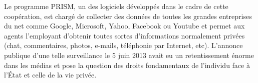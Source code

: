 \documentclass[article, french]{yReport}
\begin{document}
	Le programme PRISM, un des logiciels développés dans le cadre de cette coopération, est chargé de collecter des données de toutes les grandes entreprises du net comme Google, Microsoft, Yahoo, Facebook ou Youtube et permet aux agents l'employant d'obtenir toutes sortes d'informations normalement privées (chat, commentaires, photos, e-mails, téléphonie par Internet, etc).
	L'annonce publique d'une telle surveillance le 5 juin 2013 avait eu un retentissement énorme dans les médias et pose la question des droits fondamentaux de l'individu face à l'État et celle de la vie privée.
	
\end{document}
